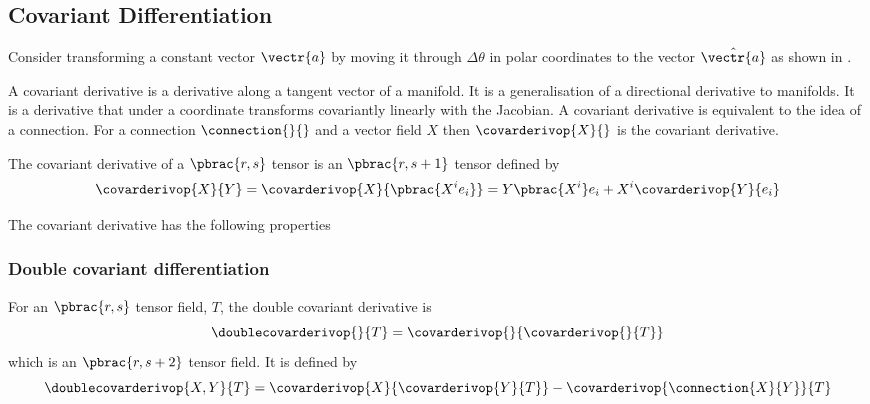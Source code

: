 \subsection{Covariant Differentiation}

Consider transforming a constant vector $\vectr{a}$ by moving it
through $\Delta\theta$ in polar coordinates to the vector
$\hat{\vectr{a}}$ as shown in
.


A covariant derivative is a derivative along a tangent vector of a
manifold. It is a generalisation of a directional derivative to manifolds. It
is a derivative that under a coordinate transforms covariantly \ie linearly
with the Jacobian. A covariant derivative is equivalent to the idea of a
connection. For a connection $\connection{}{}$ and a vector field $X$ then
$\covarderivop{X}{}$ is the covariant derivative. 

The covariant derivative of a $\pbrac{r,s}$ tensor is an $\pbrac{r,s+1}$
tensor defined by
\begin{equation}
  \covarderivop{X}{Y}=\covarderivop{X}{\pbrac{X^{i}e_{i}}}=Y\pbrac{X^{i}}e_{i}+X^{i}\covarderivop{Y}{e_{i}}
\end{equation}

The covariant derivative has the following properties

\subsubsection{Double covariant differentiation}

For an $\pbrac{r,s}$ tensor field, $T$, the double covariant derivative is
\begin{equation}
  \doublecovarderivop{}{T}=\covarderivop{}{\covarderivop{}{T}}
\end{equation}
which is an $\pbrac{r,s+2}$ tensor field. It is defined by
\begin{equation}
  \doublecovarderivop{X,Y}{T}=\covarderivop{X}{\covarderivop{Y}{T}}-\covarderivop{\connection{X}{Y}}{T}
\end{equation}

